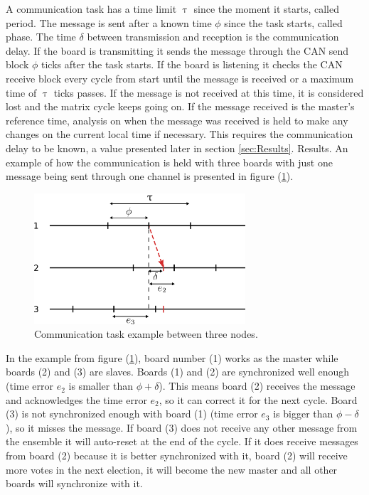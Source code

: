 \documentclass[table,xcdraw]{article}
\begin{document}
A communication task has a time limit $\uptau$ since the moment it starts, called period. The message is sent after a known time $\phi$ since the task starts, called phase. The time $\delta$ between transmission and reception is the communication delay. If the board is transmitting it sends the message through the CAN send block $\phi$ ticks after the task starts. If the board is listening it checks the CAN receive block every cycle from start until the message is received or a maximum time of $\uptau$ ticks passes. If the message is not received at this time, it is considered lost and the matrix cycle keeps going on. If the message received is the master's reference time, analysis on when the message was received is held to make any changes on the current local time if necessary. This requires the communication delay to be known, a value presented later in section \ref{sec:Results}. Results. An example of how the communication is held with three boards with just one message being sent through one channel is presented in figure (\ref{fig:com_task_ex}).\\

\begin{figure}[h!]
    \centering
    \includegraphics[width=0.7\textwidth]{figures/methodology/comm_task_ex.png}
    \caption{Communication task example between three nodes.}
    \label{fig:com_task_ex}
\end{figure}

In the example from figure (\ref{fig:com_task_ex}), board number (1) works as the master while boards (2) and (3) are slaves. Boards (1) and (2) are synchronized well enough (time error $e_2$ is smaller than $\phi + \delta$). This means board (2) receives the message and acknowledges the time error $e_2$, so it can correct it for the next cycle. Board (3) is not synchronized enough with board (1) (time error $e_3$ is bigger than $\phi - \delta$), so it misses the message. If board (3) does not receive any other message from the ensemble it will auto-reset at the end of the cycle. If it does receive messages from board (2) because it is better synchronized with it, board (2) will receive more votes in the next election, it will become the new master and all other boards will synchronize with it.\\
\end{document}
